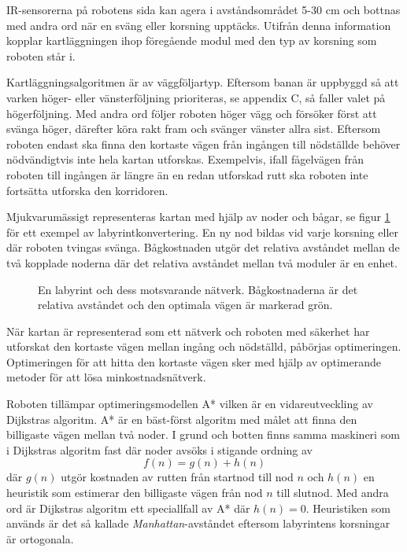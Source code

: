 \documentclass[11pt]{article}
\begin{document}
\begin{flushleft}
IR-sensorerna på robotens sida kan agera i avståndsområdet 5-30 cm och bottnas med andra ord när en sväng eller korsning upptäcks. Utifrån denna information kopplar kartläggningen ihop föregående modul med den typ av korsning som roboten står i. 

Kartläggningsalgoritmen är av väggföljartyp. Eftersom banan är uppbyggd så att varken höger- eller vänsterföljning prioriteras, se appendix C, så faller valet på högerföljning. Med andra ord följer roboten höger vägg och försöker först att svänga höger, därefter köra rakt fram och svänger vänster allra sist. Eftersom roboten endast ska finna den kortaste vägen från ingången till nödställde behöver nödvändigtvis inte hela kartan utforskas. Exempelvis, ifall fågelvägen från roboten till ingången är längre än en redan utforskad rutt ska roboten inte fortsätta utforska den korridoren.

Mjukvarumässigt representeras kartan med hjälp av noder och bågar, se figur \ref{labToGraph} för ett exempel av labyrintkonvertering. En ny nod bildas vid varje korsning eller där roboten tvingas svänga. Bågkostnaden utgör det relativa avståndet mellan de två kopplade noderna där det relativa avståndet mellan två moduler är en enhet.

\begin{figure}[htbp]
\centering
\noindent\resizebox{.6\linewidth}{!}{
	}
	\caption{En labyrint och dess motsvarande nätverk. Bågkostnaderna är det relativa avståndet och den optimala vägen är markerad grön.\label{labToGraph}}	
\end{figure}

När kartan är representerad som ett nätverk och roboten med säkerhet har utforskat den kortaste vägen mellan ingång och nödställd, påbörjas optimeringen. Optimeringen för att hitta den kortaste vägen sker med hjälp av optimerande metoder för att lösa minkostnadsnätverk.

Roboten tillämpar optimeringsmodellen A* vilken är en vidareutveckling av Dijkstras algoritm. A* är en bäst-först algoritm med målet att finna den billigaste vägen mellan två noder. I grund och botten finns samma maskineri som i Dijkstras algoritm fast där noder avsöks i stigande ordning av
\begin{equation*}
	f(n) = g(n) + h(n)
\end{equation*}
där $g(n)$ utgör kostnaden av rutten från startnod till nod $n$ och $h(n)$ en heuristik som estimerar den billigaste vägen från nod $n$ till slutnod. Med andra ord är Dijkstras algoritm ett speciallfall av A* där $h(n) = 0$. Heuristiken som används är det så kallade \emph{Manhattan}-avståndet eftersom labyrintens korsningar är ortogonala.


\end{flushleft}
\end{document}
